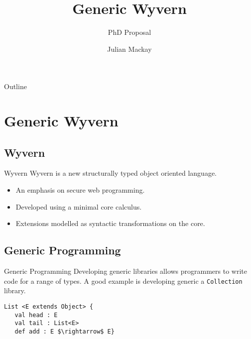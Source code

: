 \documentclass[dvipsnames]{beamer}
\title{Generic Wyvern}
\subtitle{PhD Proposal}
\author{Julian Mackay}
\institute[VUW] %
{
  School of Engineering and Computer Science\\
  Victoria University of Wellington
  }
\date{}
\begin{document}
\begin{frame}
  \titlepage
\end{frame}

\begin{frame}{Outline}
  \tableofcontents[pausesections]
\end{frame}

\section{Generic Wyvern}

\subsection{Wyvern}

\begin{frame}{Wyvern}
Wyvern is a new structurally typed object oriented language.
\begin{itemize}
\item
An emphasis on secure web programming.
\item
Developed using a minimal core calculus.
\item
Extensions modelled as syntactic transformations on the core.
\end{itemize}
\end{frame}

\subsection{Generic Programming}


\begin{frame}{Generic Programming}
Developing generic libraries allows programmers to write code for a range of types. A good example is developing generic a \texttt{Collection} library.
\end{frame}

\begin{lrbox}{\tpExList}
\begin{lstlisting}[mathescape, style=customlang]
List <E extends Object> {
   val head : E
   val tail : List<E>
   def add : E $\rightarrow$ E}
\end{lstlisting}
\end{lrbox}
\end{document}
